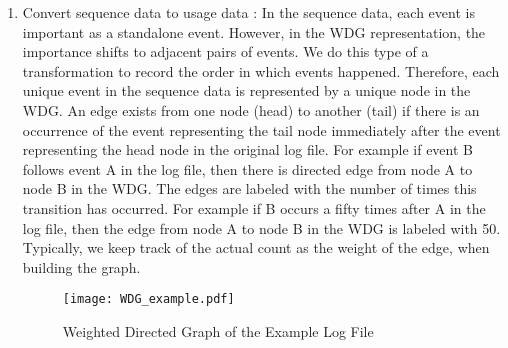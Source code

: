 \begin{enumerate}
                \begin{enumerate}
                \item Convert sequence data to usage data :
In the sequence data, each event is important as a standalone event. However, in the WDG representation, the importance shifts to adjacent pairs of events. We do this type of a transformation to record the order in which events happened. Therefore, each unique event in the sequence data is represented by a unique node in the WDG. An edge exists from one node (head) to another (tail) if there is an occurrence of the event representing the tail node immediately after the event representing the head node in the original log file. For example if event B follows event A in the log file, then there is directed edge from node A to node B in the WDG. The edges are labeled with the number of times this transition has occurred.  For example if B occurs a fifty times after A in the log file, then the edge from node A to node B in the WDG is labeled with 50. Typically, we keep track of the actual count as the weight of the edge, when building the graph. 

\begin{figure}[!t]
\centering
\texttt{[image: WDG\_example.pdf]}
\caption{Weighted Directed Graph of the Example Log File}
\label{WDG_example}
\end{figure}


\end{enumerate}
\end{enumerate}
